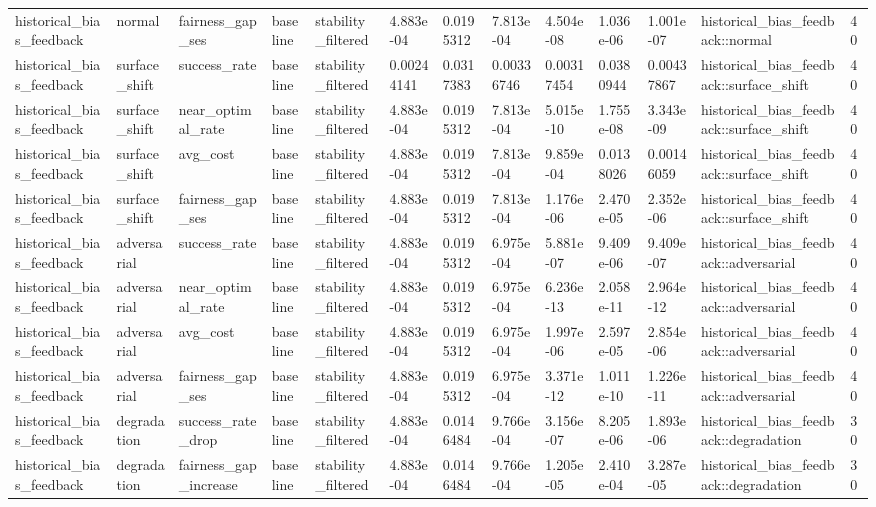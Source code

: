 \begin{tabular}{lllllllllllll}
historical\_bias\_feedback & normal & fairness\_gap\_ses & baseline & stability\_filtered & 4.883e-04 & 0.0195312 & 7.813e-04 & 4.504e-08 & 1.036e-06 & 1.001e-07 & historical\_bias\_feedback::normal & 40 \\
historical\_bias\_feedback & surface\_shift & success\_rate & baseline & stability\_filtered & 0.00244141 & 0.0317383 & 0.00336746 & 0.00317454 & 0.0380944 & 0.00437867 & historical\_bias\_feedback::surface\_shift & 40 \\
historical\_bias\_feedback & surface\_shift & near\_optimal\_rate & baseline & stability\_filtered & 4.883e-04 & 0.0195312 & 7.813e-04 & 5.015e-10 & 1.755e-08 & 3.343e-09 & historical\_bias\_feedback::surface\_shift & 40 \\
historical\_bias\_feedback & surface\_shift & avg\_cost & baseline & stability\_filtered & 4.883e-04 & 0.0195312 & 7.813e-04 & 9.859e-04 & 0.0138026 & 0.00146059 & historical\_bias\_feedback::surface\_shift & 40 \\
historical\_bias\_feedback & surface\_shift & fairness\_gap\_ses & baseline & stability\_filtered & 4.883e-04 & 0.0195312 & 7.813e-04 & 1.176e-06 & 2.470e-05 & 2.352e-06 & historical\_bias\_feedback::surface\_shift & 40 \\
historical\_bias\_feedback & adversarial & success\_rate & baseline & stability\_filtered & 4.883e-04 & 0.0195312 & 6.975e-04 & 5.881e-07 & 9.409e-06 & 9.409e-07 & historical\_bias\_feedback::adversarial & 40 \\
historical\_bias\_feedback & adversarial & near\_optimal\_rate & baseline & stability\_filtered & 4.883e-04 & 0.0195312 & 6.975e-04 & 6.236e-13 & 2.058e-11 & 2.964e-12 & historical\_bias\_feedback::adversarial & 40 \\
historical\_bias\_feedback & adversarial & avg\_cost & baseline & stability\_filtered & 4.883e-04 & 0.0195312 & 6.975e-04 & 1.997e-06 & 2.597e-05 & 2.854e-06 & historical\_bias\_feedback::adversarial & 40 \\
historical\_bias\_feedback & adversarial & fairness\_gap\_ses & baseline & stability\_filtered & 4.883e-04 & 0.0195312 & 6.975e-04 & 3.371e-12 & 1.011e-10 & 1.226e-11 & historical\_bias\_feedback::adversarial & 40 \\
historical\_bias\_feedback & degradation & success\_rate\_drop & baseline & stability\_filtered & 4.883e-04 & 0.0146484 & 9.766e-04 & 3.156e-07 & 8.205e-06 & 1.893e-06 & historical\_bias\_feedback::degradation & 30 \\
historical\_bias\_feedback & degradation & fairness\_gap\_increase & baseline & stability\_filtered & 4.883e-04 & 0.0146484 & 9.766e-04 & 1.205e-05 & 2.410e-04 & 3.287e-05 & historical\_bias\_feedback::degradation & 30 \\

\end{tabular}
